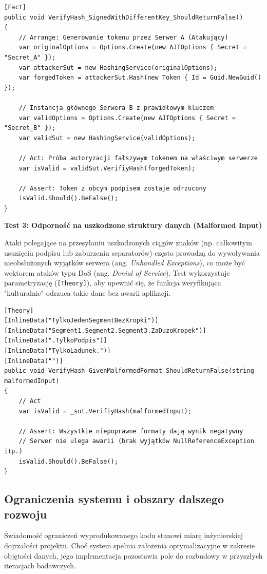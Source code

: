 \documentclass{SGGW-thesis}
\begin{document}
\begin{verbatim}
[Fact]
public void VerifyHash_SignedWithDifferentKey_ShouldReturnFalse()
{
    // Arrange: Generowanie tokenu przez Serwer A (Atakujący)
    var originalOptions = Options.Create(new AJTOptions { Secret = "Secret_A" });
    var attackerSut = new HashingService(originalOptions);
    var forgedToken = attackerSut.Hash(new Token { Id = Guid.NewGuid() });

    // Instancja głównego Serwera B z prawidłowym kluczem
    var validOptions = Options.Create(new AJTOptions { Secret = "Secret_B" });
    var validSut = new HashingService(validOptions);

    // Act: Próba autoryzacji fałszywym tokenem na właściwym serwerze
    var isValid = validSut.VerifiyHash(forgedToken);

    // Assert: Token z obcym podpisem zostaje odrzucony
    isValid.Should().BeFalse();
}
\end{verbatim}

\textbf{Test 3: Odporność na uszkodzone struktury danych (Malformed Input)}

Ataki polegające na przesyłaniu uszkodzonych ciągów znaków (np. całkowitym usunięciu podpisu lub zaburzeniu separatorów) często prowadzą do wywoływania nieobsłużonych wyjątków serwera (ang. \textit{Unhandled Exceptions}), co może być wektorem ataków typu DoS (ang. \textit{Denial of Service}). Test wykorzystuje parametryzację (\texttt{[Theory]}), aby upewnić się, że funkcja weryfikująca "kulturalnie" odrzuca takie dane bez awarii aplikacji.

\begin{verbatim}
[Theory]
[InlineData("TylkoJedenSegmentBezKropki")]
[InlineData("Segment1.Segment2.Segment3.ZaDuzoKropek")]
[InlineData(".TylkoPodpis")]
[InlineData("TylkoLadunek.")]
[InlineData("")]
public void VerifyHash_GivenMalformedFormat_ShouldReturnFalse(string malformedInput)
{
    // Act
    var isValid = _sut.VerifiyHash(malformedInput);

    // Assert: Wszystkie niepoprawne formaty dają wynik negatywny
    // Serwer nie ulega awarii (brak wyjątków NullReferenceException itp.)
    isValid.Should().BeFalse();
}
\end{verbatim}

\subsection{Ograniczenia systemu i obszary dalszego rozwoju}

Świadomość ograniczeń wyprodukowanego kodu stanowi miarę inżynierskiej dojrzałości projektu. Choć system spełnia założenia optymalizacyjne w zakresie objętości danych, jego implementacja pozostawia pole do rozbudowy w przyszłych iteracjach badawczych. 
\end{document}
